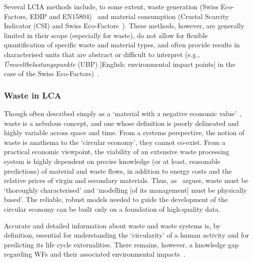 \documentclass[a4paper,fleqn]{cas-dc}
\begin{document}
Several LCIA methods include, to some extent, waste generation (Swiss Eco-Factors, EDIP and EN15804)~\citep{foen2021ecofactors,hauschild2003edip,cen2019en15804} and material consumption (Crustal Scarcity Indicator (CSI) and Swiss Eco-Factors~\citep{arvidsson2020csi,foen2021ecofactors}). These methods, however, are generally limited in their scope (especially for waste), do not allow for flexible quantification of specific waste and material types, and often provide results in characterised units that are abstract or difficult to interpret (e.g., \textit{Ümweltbelastungspunkte} (UBP) [English: environmental impact points] in the case of the Swiss Eco-Factors)~\citep{su2020sustainableproddev}.


\subsubsection{Waste in LCA}\label{sec:intro-waste}

Though often described simply as a `material with a negative economic value'~\citep{guinee2004economicallocation}, waste is a nebulous concept, and one whose definition is poorly delineated and highly variable across space and time. From a systems perspective, the notion of waste is anathema to the `circular economy', they cannot co-exist. From a practical economic viewpoint, the viability of an extensive waste processing system is highly dependent on precise knowledge (or at least, reasonable predictions) of material and waste flows, in addition to energy costs and the relative prices of virgin and secondary materials. Thus, as~\cite{bisinella2024wastelca} argues, waste must be `thoroughly characterised' and `modelling [of its management] must be physically based'. The reliable, robust models needed to guide the development of the circular economy can be built only on a foundation of high-quality data.

Accurate and detailed information about waste and waste systems is, by definition, essential for understanding the `circularity' of a human activity and for predicting its life cycle externalities. There remains, however, a knowledge gap regarding WFs and their associated environmental impacts~\citep{laurenti2023wastefootprint}.
\end{document}
